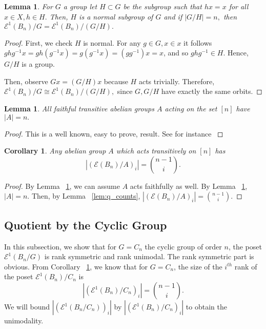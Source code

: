 \documentclass[10 pt]{amsart}
\theoremstyle{plain}
\newtheorem{lem}[thm]{Lemma}
\newtheorem{cor}[thm]{Corollary}
\theoremstyle{definition}
\theoremstyle{remark}
\numberwithin{equation}{section}
\newcommand\ssec{\subsection}
\begin{document}
\begin{lem}
\label{lem:faithful_action}
For $G$ a group let $H \subset G$ be the subgroup such that $hx = x$ for all $x \in X,h \in H.$ Then, $H$ is a normal subgroup of $G$ and if $|G/H| = n,$ then $\mathcal E^1(B_n)/G =\mathcal E^1(B_n)/(G/H).$
\end{lem}
\begin{proof}
First, we check $H$ is normal. For any $g \in G,x \in x$ it follows $ghg^{-1}x = gh(g^{-1}x) = g(g^{-1}x) = (gg^{-1})x = x$, and so $ghg^{-1} \in H.$ Hence, $G/H$ is a group.

Then, observe $Gx = (G/H)x$ because $H$ acts trivially. Therefore, $\mathcal E^1(B_n)/G \cong \mathcal E^1(B_n)/(G/H),$ since $G,G/H$ have exactly the same orbits.
\end{proof}

\begin{lem}
\label{lem:transitive_abelian}
All faithful transitive abelian groups $A$ acting on the set $[n]$ have $|A| = n.$
\end{lem}
\begin{proof}
This is a well known, easy to prove, result. See for instance \cite{stack}
\end{proof}

\begin{cor}
\label{cor:transitive_abelian_ranks}
Any abelian group $A$ which acts transitively on $[n]$ has $$|(\mathcal E (B_n)/A)_i|= \binom{n-1}{i}.$$
\end{cor}
\begin{proof}
By Lemma ~\ref{lem:faithful_action}, we can assume $A$ acts faithfully as well.
By Lemma ~\ref{lem:transitive_abelian}, $|A| = n.$ Then, by Lemma ~\ref{lem:q_counts}, $ \displaystyle |(\mathcal E (B_n)/A)_i| = \binom{n-1}{i}.$
\end{proof}







\ssec{Quotient by the Cyclic Group}
\label{ssec:cyclic}

In this subsection, we show that for $G = C_n$ the cyclic group of order $n$, the poset $\mathcal E^1(B_n/G)$ is rank symmetric and rank unimodal. The rank symmetric part is obvious. From Corollary ~\ref{cor:transitive_abelian_ranks}, we know that for $G = C_n$, the size of the $i^{th}$ rank of the poset $\mathcal E^1 (B_n)/C_n$ is $$|(\mathcal E^1 (B_n)/C_n)_i| = \binom{n-1}{i}.$$
We will bound $|(\mathcal E^1(B_n/C_n))_i|$ by  $|(\mathcal E^1 (B_n)/C_n)_i|$ to obtain the unimodality. 
\end{document}
